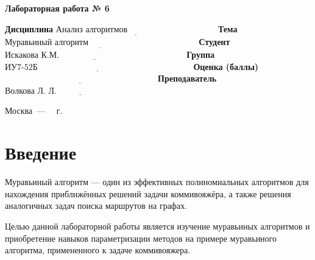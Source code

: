 \documentclass[12pt]{report}
\begin{document}
\begin{center}
\Large\textbf{Лабораторная работа № 6}
\end{center}
\vspace{\baselineskip}
\noindent\textbf{Дисциплина} $\underline{\text{Анализ алгоритмов~~~~~~~~~~~~~~~~~~~~~~~~~~~~~~~}}$\newline\newline
\noindent\textbf{Тема} $\underline{\text{Муравьиный алгоритм~~~~~~~~~~~~~~~~~~~~~~~~~~~~~~~~~~~~~~}}$\newline\newline
\noindent\textbf{Студент} $\underline{\text{Искакова К.М.~~~~~~~~~~~~~~~~~~~~~~~~~~~~~~~~~~~~~~~~~~~~}}$\newline\newline
\noindent\textbf{Группа} $\underline{\text{ИУ7-52Б~~~~~~~~~~~~~~~~~~~~~~~~~~~~~~~~~~~~~~~~~~~~~~~~~~~~~~}}$\newline\newline
\noindent\textbf{Оценка (баллы)} $\underline{\text{~~~~~~~~~~~~~~~~~~~~~~~~~~~~~~~~~~~~~~~~~~~~~~~~~~~~~}}$\newline\newline
\noindent\textbf{Преподаватель} $\underline{\text{Волкова Л. Л.~~~~~~~~~~~~~~~~~~~~~~~~~~~~~~~~~~~}}$\newline

\begin{center}
	\vfill
	Москва~---~\the\year
	~г.
\end{center}
\clearpage

%
\renewcommand\contentsname{Содержание}

\tableofcontents

\newpage
\chapter*{Введение}

Муравьиный алгоритм — один из эффективных полиномиальных алгоритмов для нахождения приближённых решений задачи коммивояжёра, а также решения аналогичных задач поиска маршрутов на графах.

Целью данной лабораторной работы является изучение муравьиных алгоритмов и приобретение навыков параметризации методов на примере муравьиного алгоритма, примененного к задаче коммивояжера. 

\vspace{\baselineskip}
\end{document}
